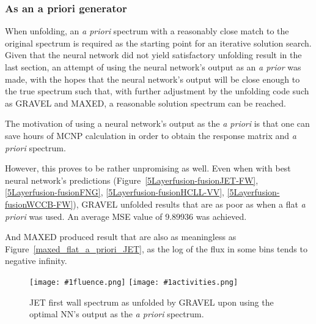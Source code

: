 \documentclass[a4paper, 12pt]{article}
\newcommand{\fluenceandactivities}[1]{
\texttt{[image: \#1fluence.png]}
\texttt{[image: \#1activities.png]}
}
\begin{document}
\subsubsection{As an a priori generator}
When unfolding, an \emph{a priori} spectrum with a reasonably close match to the original spectrum is required as the starting point for an iterative solution search. Given that the neural network did not yield satisfactory unfolding result in the last section, an attempt of using the neural network's output as an \emph{a prior} was made, with the hopes that the neural network's output will be close enough to the true spectrum such that, with further adjustment by the unfolding code such as GRAVEL and MAXED, a reasonable solution spectrum can be reached.

The motivation of using a neural network's output as the \emph{a priori} is that one can save hours of MCNP calculation in order to obtain the response matrix and \emph{a priori} spectrum.

However, this proves to be rather unpromising as well. Even when with best neural network's predictions (Figure~\ref{5Layerfusion-fusionJET-FW}, \ref{5Layerfusion-fusionFNG}, \ref{5Layerfusion-fusionHCLL-VV}, \ref{5Layerfusion-fusionWCCB-FW}), GRAVEL unfolded results that are as poor as when a flat \emph{a priori} was used. An average MSE value of 9.89936 was achieved.

And MAXED produced result that are also as meaningless as Figure~\ref{maxed_flat_a_priori_JET}, as the log of the flux in some bins tends to negative infinity.

\begin{figure}
    \centering
    \fluenceandactivities{/home/ocean/Documents/GitHubDir/unfolding/unfolding/unfoldingsuite/neuralnetwork/realinputEarlyStopping/comparison/real_fusion_test_gravel_nn_a_priori_test_001_}
    \caption{JET first wall spectrum as unfolded by GRAVEL upon using the optimal NN's output as the \emph{a priori} spectrum.}\label{gravel_nn_a_priori_JET}
\end{figure}

\end{document}
